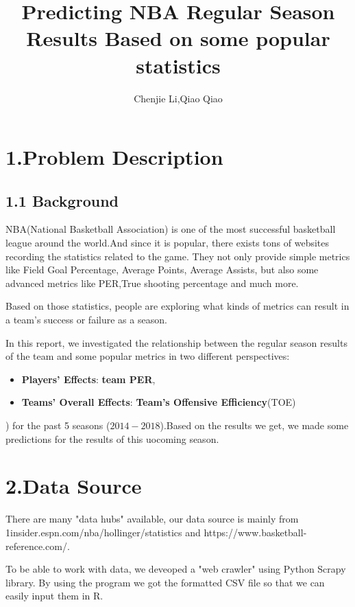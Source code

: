 \documentclass[11pt]{article}
\begin{document}
\title{Predicting NBA Regular Season Results Based on some popular statistics}
\author{Chenjie Li,Qiao Qiao}
\maketitle
\section*{1.Problem Description}
\subsection*{1.1 Background}
\hspace{1.5em}NBA(National Basketball Association) is one of the most successful basketball league around the world.And since it is popular, there exists tons of websites recording the statistics related to the game. They not only provide simple metrics like Field Goal Percentage,  Average Points, Average Assists, but also some advanced metrics like PER,True shooting percentage and much more.

Based on those statistics, people are exploring what kinds of metrics can result in a team's success or failure as a season.

In this report, we investigated the relationship between the regular season results of the team and some popular metrics in two different perspectives: 
\begin{itemize}
\item \textbf{Players' Effects}:	\textbf{team PER},
\item \textbf{Teams' Overall Effects}: \textbf{Team's Offensive Efficiency}(TOE)
\end{itemize}
) for the past 5 seasons ($2014-2018$).Based on the results we get, we made some predictions for the results of this uocoming season.

\section*{2.Data Source}
\hspace{1.5em}There are many "data hubs" available, our data source is mainly from \\1insider.espn.com/nba/hollinger/statistics and https://www.basketball-reference.com/.

To be able to work with data, we deveoped a "web crawler" using Python Scrapy library. By using the program we got the formatted CSV file so that we can easily input them in R.
\end{document}
